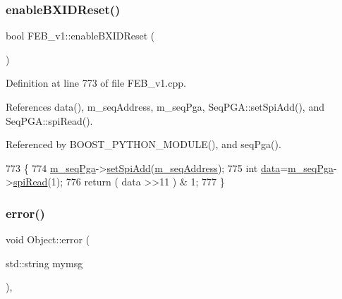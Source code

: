\subsubsection{\texorpdfstring{enable\+B\+X\+I\+D\+Reset()}{enableBXIDReset()}}
{\footnotesize\ttfamily bool F\+E\+B\+\_\+v1\+::enable\+B\+X\+I\+D\+Reset (\begin{DoxyParamCaption}{ }\end{DoxyParamCaption})}



Definition at line 773 of file F\+E\+B\+\_\+v1.\+cpp.



References data(), m\+\_\+seq\+Address, m\+\_\+seq\+Pga, Seq\+P\+G\+A\+::set\+Spi\+Add(), and Seq\+P\+G\+A\+::spi\+Read().



Referenced by B\+O\+O\+S\+T\+\_\+\+P\+Y\+T\+H\+O\+N\+\_\+\+M\+O\+D\+U\+L\+E(), and seq\+Pga().


\begin{DoxyCode}
773                              \{
774   \hyperlink{classFEB__v1_a6c7804ac86796f233a8393043adf2e77}{m\_seqPga}->\hyperlink{classSeqPGA_ac998ce3a6d9b5f2e88cc8393f8c1df53}{setSpiAdd}(\hyperlink{classFEB__v1_a1c1eb093fd1733b9510fcf8bc5c7ad08}{m\_seqAddress});
775   \textcolor{keywordtype}{int} \hyperlink{classFEB__v1_a6bca4320bd3bbbc32efc81097f33421a}{data}=\hyperlink{classFEB__v1_a6c7804ac86796f233a8393043adf2e77}{m\_seqPga}->\hyperlink{classSeqPGA_ab3d0e5e5d4014bc7a92588a76b8713d4}{spiRead}(1);
776   \textcolor{keywordflow}{return} ( data >>11 ) & 1;
777 \}
\end{DoxyCode}
\mbox{\label{classObject_a204a95f57818c0f811933917a30eff45}} 
\subsubsection{\texorpdfstring{error()}{error()}\hspace{0.1cm}{\footnotesize\ttfamily [1/2]}}
{\footnotesize\ttfamily void Object\+::error (\begin{DoxyParamCaption}\item[{std\+::string}]{mymsg }\end{DoxyParamCaption})\hspace{0.3cm}{\ttfamily [inline]}, {\ttfamily [inherited]}}




